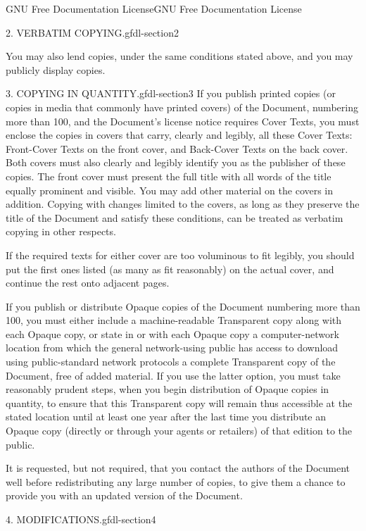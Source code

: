 \documentclass[10pt,]{book}
\numberwithin{equation}{section}
\begin{document}
\begin{appendixptx}{GNU Free Documentation License}{}{GNU Free Documentation License}{}{}
\begin{paragraphs}{2. VERBATIM COPYING.}{gfdl-section2}
\par
\hypertarget{p-536}{}%
You may also lend copies, under the same conditions stated above, and you may publicly display copies.%
\end{paragraphs}%
\begin{paragraphs}{3. COPYING IN QUANTITY.}{gfdl-section3}%
\hypertarget{p-537}{}%
If you publish printed copies (or copies in media that commonly have printed covers) of the Document, numbering more than 100, and the Document's license notice requires Cover Texts, you must enclose the copies in covers that carry, clearly and legibly, all these Cover Texts: Front-Cover Texts on the front cover, and Back-Cover Texts on the back cover. Both covers must also clearly and legibly identify you as the publisher of these copies. The front cover must present the full title with all words of the title equally prominent and visible. You may add other material on the covers in addition. Copying with changes limited to the covers, as long as they preserve the title of the Document and satisfy these conditions, can be treated as verbatim copying in other respects.%
\par
\hypertarget{p-538}{}%
If the required texts for either cover are too voluminous to fit legibly, you should put the first ones listed (as many as fit reasonably) on the actual cover, and continue the rest onto adjacent pages.%
\par
\hypertarget{p-539}{}%
If you publish or distribute Opaque copies of the Document numbering more than 100, you must either include a machine-readable Transparent copy along with each Opaque copy, or state in or with each Opaque copy a computer-network location from which the general network-using public has access to download using public-standard network protocols a complete Transparent copy of the Document, free of added material. If you use the latter option, you must take reasonably prudent steps, when you begin distribution of Opaque copies in quantity, to ensure that this Transparent copy will remain thus accessible at the stated location until at least one year after the last time you distribute an Opaque copy (directly or through your agents or retailers) of that edition to the public.%
\par
\hypertarget{p-540}{}%
It is requested, but not required, that you contact the authors of the Document well before redistributing any large number of copies, to give them a chance to provide you with an updated version of the Document.%
\end{paragraphs}%
\begin{paragraphs}{4. MODIFICATIONS.}{gfdl-section4}%

\end{paragraphs}
\end{appendixptx}
\end{document}
